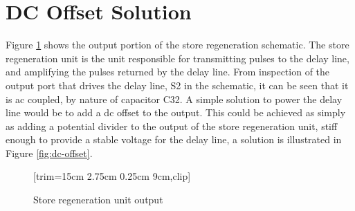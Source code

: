 \section{DC Offset Solution} \label{sec:power-dc-offset}
Figure \ref{fig:store-regen-output} shows the output portion of the store regeneration schematic. The store regeneration unit is the unit responsible for transmitting pulses to the delay line, and amplifying the pulses returned by the delay line. From inspection of the output port that drives the delay line, S2 in the schematic, it can be seen that it is \gls{ac} coupled, by nature of capacitor C32. A simple solution to power the delay line would be to add a \gls{dc} offset to the output. This could be achieved as simply as adding a potential divider to the output of the store regeneration unit, stiff enough to provide a stable voltage for the delay line, a solution is illustrated in Figure \ref{fig:dc-offset}.

\begin{figure}[ht]
	\centering
	[trim={15cm 2.75cm 0.25cm 9cm},clip] %
	\caption{Store regeneration unit output \cite{burton2014b}}
	\label{fig:store-regen-output}
\end{figure}


